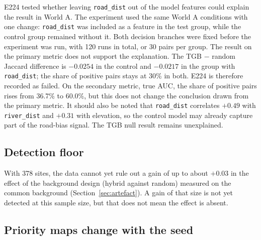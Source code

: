 \documentclass[12pt]{article}
\begin{document}
E224 tested whether leaving \texttt{road\_dist} out of the model features could explain the result in World A.
The experiment used the same World A conditions with one change: \texttt{road\_dist} was included as a feature in the test group, while the control group remained without it.
Both decision branches were fixed before the experiment was run, with 120 runs in total, or 30 pairs per group.
The result on the primary metric does not support the explanation.
The TGB $-$ random Jaccard difference is $-0.0254$ in the control and $-0.0217$ in the group with \texttt{road\_dist}; the share of positive pairs stays at 30\% in both.
E224 is therefore recorded as failed.
On the secondary metric, true AUC, the share of positive pairs rises from 36.7\% to 60.0\%, but this does not change the conclusion drawn from the primary metric.
It should also be noted that \texttt{road\_dist} correlates $+0.49$ with \texttt{river\_dist} and $+0.31$ with elevation, so the control model may already capture part of the road-bias signal.
The TGB null result remains unexplained.

\subsection{Detection floor}
\label{sec:ci}

With 378 sites, the data cannot yet rule out a gain of up to about $+0.03$ in the effect of the background design (hybrid against random) measured on the common background (Section~\ref{sec:artefact}).
A gain of that size is not yet detected at this sample size, but that does not mean the effect is absent.

\subsection{Priority maps change with the seed}
\label{sec:prioritymaps}
\end{document}
